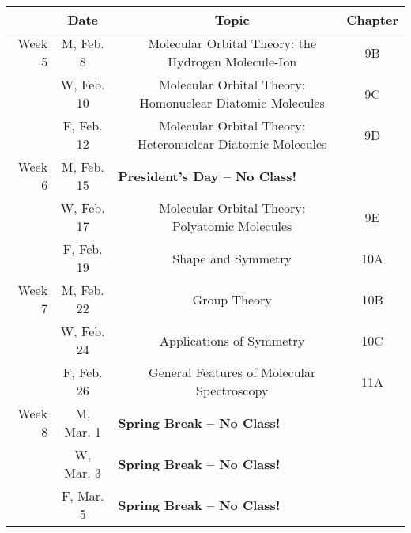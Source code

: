 \documentclass[12pt, letterpaper]{article}
\begin{document}
\noindent
\begin{tabular}{rcccc}
	        & Date       &                                                                  & Topic                                                      & Chapter \\
	\midrule
	Week 5  & M, Feb. 8  &                                                                  & Molecular Orbital Theory: the Hydrogen Molecule-Ion        & 9B      \\
	        & W, Feb. 10 &                                                                  & Molecular Orbital Theory: Homonuclear Diatomic Molecules   & 9C      \\
	        & F, Feb. 12 &                                                                  & Molecular Orbital Theory: Heteronuclear Diatomic Molecules & 9D      \\
	\midrule
	Week 6  & M, Feb. 15 & \multicolumn{3}{l}{\textbf{President's Day -- No Class!}}                                                                               \\
	        & W, Feb. 17 &                                                                  & Molecular Orbital Theory: Polyatomic Molecules             & 9E      \\
	        & F, Feb. 19 &                                                                  & Shape and Symmetry                                         & 10A     \\
	\midrule
	Week 7  & M, Feb. 22 &                                                                  & Group Theory                                               & 10B     \\
	        & W, Feb. 24 &                                                                  & Applications of Symmetry                                   & 10C     \\
	        & F, Feb. 26 &                                                                  & General Features of Molecular Spectroscopy                 & 11A     \\
	\midrule
	Week 8  & M, Mar. 1  & \multicolumn{3}{l}{\textbf{Spring Break -- No Class!}}                                                                                  \\
	        & W, Mar. 3  & \multicolumn{3}{l}{\textbf{Spring Break -- No Class!}}                                                                                  \\
	        & F, Mar. 5  & \multicolumn{3}{l}{\textbf{Spring Break -- No Class!}}                                                                                  \\

\end{tabular}
\end{document}
